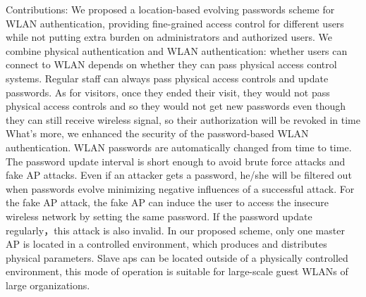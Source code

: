 Contributions:
We proposed a location-based evolving passwords scheme for WLAN authentication, providing fine-grained access control for different users while not putting extra burden on administrators and authorized users. 
We combine physical authentication and WLAN authentication: whether users can connect to WLAN depends on whether they can pass physical access control systems. 
Regular staff can always pass physical access controls and update passwords. As for visitors, once they ended their visit, they would not pass physical access controls and so they would not get new passwords even though they can still receive wireless signal, so their authorization will be revoked in time
What’s more, we enhanced the security of the password-based WLAN authentication. WLAN passwords are automatically changed from time to time. The password update interval is short enough to avoid brute force attacks and fake AP attacks. Even if an attacker gets a password, he/she will be filtered out when passwords evolve minimizing negative influences of a successful attack. For the fake AP attack, the fake AP can induce the user to access the insecure wireless network by setting the same password. If the password  update regularly，this attack is also invalid.
In our proposed scheme, only one master AP is located in a controlled environment, which produces and distributes physical parameters. Slave aps can be located outside of a physically controlled environment, this mode of operation is suitable for large-scale guest WLANs of large organizations.
